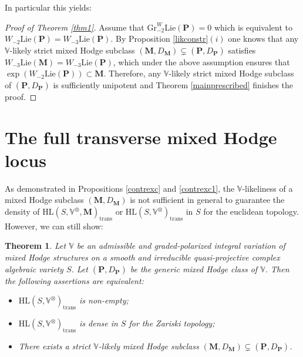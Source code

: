 \documentclass[10pt]{article}
\numberwithin{equation}{subsection}
\theoremstyle{plain}
\newtheorem{theorem}{Theorem}[section]
\theoremstyle{definition}
\theoremstyle{remark}
\newcommand{\lie}{\mathrm{Lie}}
\newcommand{\V}{\mathbb V}
\newcommand{\pp}{\mathbf P}
\newcommand{\M}{\mathbf M}
\newcommand{\HL}{\mathrm{HL}(S, \V^\otimes)}
\newcommand{\HLM}{\mathrm{HL}(S, \V^\otimes, \M)}
\newcommand{\gr}{\mathrm{Gr}}
\newcommand{\para}{\mathfrak{p}}
\newcommand{\trans}{\mathrm{trans}}
\begin{document}
In particular this yields:
\begin{proof}[Proof of Theorem \ref{thm1}]
Assume that $\gr^W_{-2} \lie(\pp) = 0$ which is equivalent to $W_{-2} \lie(\pp) = W_{-3} \lie(\pp)$. By Proposition \ref{likconstr}$(i)$ one knows that any $\V$-likely strict mixed Hodge subclass $(\M, D_\M) \subsetneq (\pp, D_\pp)$ satisfies $W_{-3} \lie(\M) = W_{-3} \lie(\pp)$, which under the above assumption ensures that $\exp(W_{-2} \lie(\pp)) \subset \M$. Therefore, any $\V$-likely strict mixed Hodge subclass of $(\pp, D_\pp)$ is sufficiently unipotent and Theorem \ref{mainprescribed} finishes the proof.
\end{proof}
\section{The full transverse mixed Hodge locus}\label{sect9}
As demonstrated in Propositions \ref{contrexc} and \ref{contrexc1}, the $\V$-likeliness of a mixed Hodge subclass $(\M, D_\M)$ is not sufficient in general to guarantee the density of $\HLM_\trans$ or $\HL_\trans$ in $S$ for the euclidean topology. However, we can still show:
\begin{theorem}\label{mainfull}
Let $\V$ be an admissible and graded-polarized integral variation of mixed Hodge structures on a smooth and irreducible quasi-projective complex algebraic variety $S$. Let $(\pp, D_\pp)$ be the generic mixed Hodge class of $\V$. Then the following assertions are equivalent:
\begin{itemize}
\item[(i)] $\HL_\trans$ is non-empty;
\item[(ii)] $\HL_\trans$ is dense in $S$ for the Zariski topology;
\item[(iii)] There exists a strict $\V$-likely mixed Hodge subclass $(\M, D_\M) \subsetneq (\pp, D_\pp)$.
\end{itemize}
\end{theorem}
\end{document}
